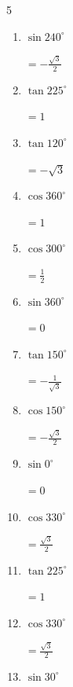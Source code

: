 \begin{multicols}{5}
\begin{enumerate}
        $\displaystyle =0$

  \item $\displaystyle \sin{240^\circ}$

        $\displaystyle =-\frac{\sqrt{3}}{2}$

  \item $\displaystyle \tan{225^\circ}$

        $\displaystyle =1$

  \item $\displaystyle \tan{120^\circ}$

        $\displaystyle =-\sqrt{3}$

  \item $\displaystyle \cos{360^\circ}$

        $\displaystyle =1$

\columnbreak %

  \item $\displaystyle \cos{300^\circ}$

        $\displaystyle =\frac{1}{2}$

  \item $\displaystyle \sin{360^\circ}$

        $\displaystyle =0$

  \item $\displaystyle \tan{150^\circ}$

        $\displaystyle =-\frac{1}{\sqrt{3}}$

  \item $\displaystyle \cos{150^\circ}$

        $\displaystyle =-\frac{\sqrt{3}}{2}$

  \item $\displaystyle \sin{0^\circ}$

        $\displaystyle =0$

  \item $\displaystyle \cos{330^\circ}$

        $\displaystyle =\frac{\sqrt{3}}{2}$

  \item $\displaystyle \tan{225^\circ}$

        $\displaystyle =1$

  \item $\displaystyle \cos{330^\circ}$

        $\displaystyle =\frac{\sqrt{3}}{2}$

  \item $\displaystyle \sin{30^\circ}$


\end{enumerate}
\end{multicols}
